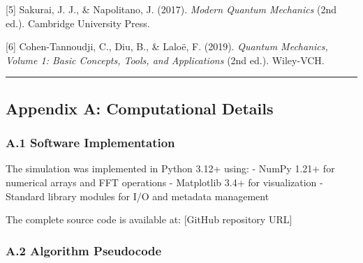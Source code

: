 \documentclass[
]{article}
\begin{document}
{[}5{]} Sakurai, J. J., \& Napolitano, J. (2017). \emph{Modern Quantum
Mechanics} (2nd ed.). Cambridge University Press.

{[}6{]} Cohen-Tannoudji, C., Diu, B., \& Laloë, F. (2019). \emph{Quantum
Mechanics, Volume 1: Basic Concepts, Tools, and Applications} (2nd ed.).
Wiley-VCH.

\begin{center}\rule{0.5\linewidth}{0.5pt}\end{center}

\subsection{Appendix A: Computational
Details}\label{appendix-a-computational-details}

\subsubsection{A.1 Software
Implementation}\label{a.1-software-implementation}

The simulation was implemented in Python 3.12+ using: - NumPy 1.21+ for
numerical arrays and FFT operations - Matplotlib 3.4+ for visualization
- Standard library modules for I/O and metadata management

The complete source code is available at: {[}GitHub repository URL{]}

\subsubsection{A.2 Algorithm Pseudocode}\label{a.2-algorithm-pseudocode}
\end{document}

